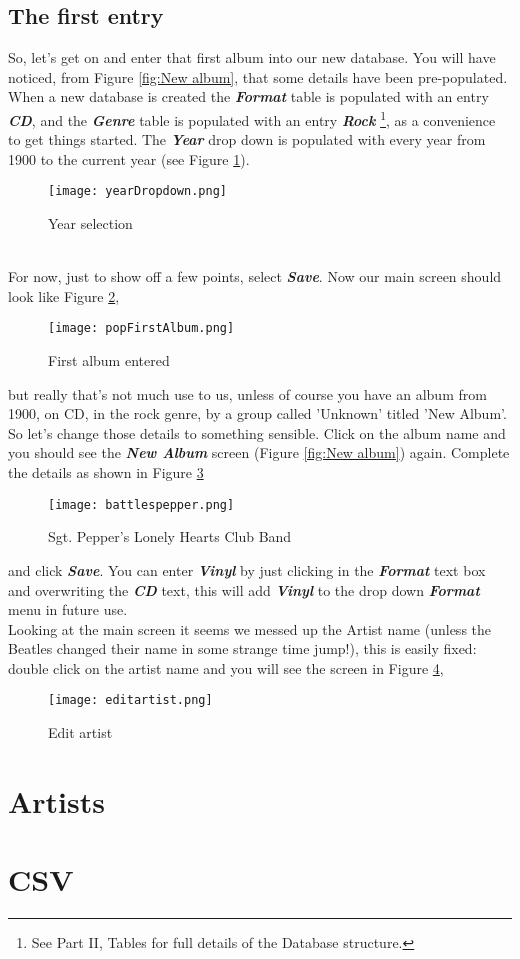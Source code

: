 \subsection{The first entry}
So, let's get on and enter that first album into our new database.  You will have noticed, from Figure
\ref{fig:New album},
that some details have been pre-populated.  When a new database is created the 
\textit{\textbf{Format}}
table is populated with an entry 
\textit{\textbf{CD}}, 
and the
\textit{\textbf{Genre}} 
table is populated with an entry 
\textit{\textbf{Rock}} 
\footnote{See Part II, Tables for  full details of the Database structure.},
as a convenience to get things started.  The 
\textit{\textbf{Year}} 
drop down is populated with every year from 1900 to the current year (see Figure 
\ref{fig:Year selection}).
\begin{figure}[!h]
 \centering
 \texttt{[image: yearDropdown.png]}
 \caption{Year selection}
 \label{fig:Year selection}
\end{figure} 
\\For now, just to show off a few points, select
\textbf{\textit{Save}}.
Now our main screen should look like Figure
\ref{fig:First album entered},
\begin{figure}[!h]
 \texttt{[image: popFirstAlbum.png]} 
 \caption{First album entered}
 \label{fig:First album entered}
\end{figure}
but really that's not much use to us, unless of course you have an album from 1900, on CD, in the rock genre, by a group called 'Unknown' titled 'New Album'.  So let's change those details to something sensible. Click on the album name and you should see the
\textit{\textbf{New Album}}
screen (Figure 
\ref{fig:New album})
again.  Complete the details as shown in Figure
\ref{fig:Sgt. Pepper's Lonely Hearts Club Band}
\begin{figure}[!h]
 \texttt{[image: battlespepper.png]}
 \caption{Sgt. Pepper's Lonely Hearts Club Band}
 \label{fig:Sgt. Pepper's Lonely Hearts Club Band}
\end{figure}
and click 
\textbf{\textit{Save}}.
You can enter
\textbf{\textit{Vinyl}}
by just clicking in the
\textbf{\textit{Format}}
text box and overwriting the
\textbf{\textit{CD}}
text, this will add
\textbf{\textit{Vinyl}}
to the drop down 
\textbf{\textit{Format}}
menu in future use.
\\Looking at the main screen it seems we messed up the Artist name (unless the Beatles changed their name in some strange time jump!), this is easily fixed: double click on the artist name and you will see the screen in Figure
\ref{fig:Edit artist},
\begin{figure}[!h]
 \texttt{[image: editartist.png]}
 \caption{Edit artist}
 \label{fig:Edit artist}
\end{figure} 


\section{Artists}
\section{CSV}
\label{sect:csv}